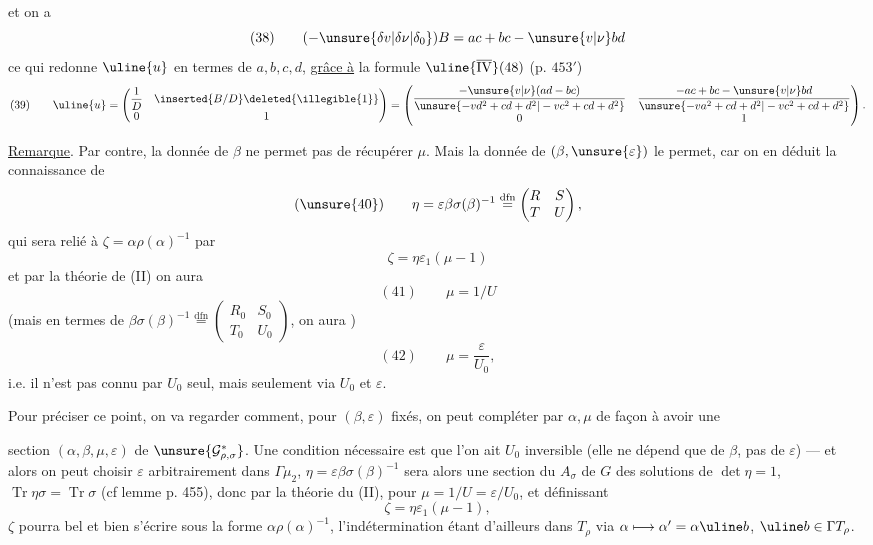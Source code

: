 et on a
\[
(38)\qquad (-\unsure{\delta v|\delta\nu|\delta_0})B=ac+bc-\unsure{v|\nu}bd
\]
ce qui redonne $\uline{u}$ en termes de $a,b,c,d$, \uline{grâce à} la formule $\uline{\overline{\mathrm{IV}}}(48)$ (p. $453'$)
\[
(39)\qquad \uline{u}=\begin{pmatrix}\dfrac1D&\inserted{B/D}\deleted{\illegible{1}}\\0&1\end{pmatrix}
=\begin{pmatrix}
\dfrac{-\unsure{v|\nu}(ad-bc)}{\unsure{-vd^2+cd+d^2|-vc^2+cd+d^2}}&\dfrac{-ac+bc-\unsure{v|\nu}bd}{\unsure{-va^2+cd+d^2|-vc^2+cd+d^2}}\\0&1
\end{pmatrix}.
\]

\uline{Remarque}. Par contre, la donnée de $\beta$   ne permet pas de récupérer $\mu$. Mais la donnée de $(\beta,\unsure{\varepsilon})$ le permet, car on en déduit la connaissance de
\[
(\unsure{40})\qquad \eta=\varepsilon\beta\sigma(\beta)^{-1}\overset{\mathrm{dfn}}=\begin{pmatrix}R&S\\T&U\end{pmatrix},
\]
qui sera relié à $\zeta=\alpha\rho(\alpha)^{-1}$ par
\[
\zeta=\eta\varepsilon_1(\mu-1)
\]
et par la théorie de (II) on aura
\[
(41)\qquad \mu=1/U
\]
(mais en termes de $\beta\sigma(\beta)^{-1}\overset{\mathrm{dfn}}=\begin{pmatrix}R_0&S_0\\T_0&U_0\end{pmatrix}$,
on aura )
\[
(42)\qquad \mu=\frac{\varepsilon}{U_0},
\]
i.e. il n'est  pas connu par $U_0$ seul, mais seulement via $U_0$ et $\varepsilon$. 

Pour préciser ce point, on va regarder  comment, pour $(\beta,\varepsilon)$ fixés, on peut compléter par $\alpha,\mu$ de façon à avoir une

section $(\alpha,\beta,\mu,\varepsilon)$ de $\unsure{\mathcal G^{*}_{\rho,\sigma}}$. Une condition nécessaire est que l'on ait $U_0$ inversible (elle ne dépend que de $\beta$, pas de $\varepsilon$) --- et alors on peut choisir $\varepsilon$ arbitrairement dans $\Gamma\mu_2$,  $\eta=\varepsilon\beta\sigma(\beta)^{-1}$ sera alors une section du  $A_\sigma$  de $G$ des solutions de $\det\eta=1$, $\operatorname{Tr}\eta\sigma=\operatorname{Tr}\sigma$ (cf lemme p. 455), donc par la théorie du (II), pour  $\mu=1/U=\varepsilon/U_0$,  et définissant
\[
\zeta=\eta\varepsilon_1(\mu-1),
\]
$\zeta$ pourra bel et bien s'écrire  sous la forme $\alpha\rho(\alpha)^{-1}$, l'indétermination étant d'ailleurs dans $T_\rho$ via $\alpha\longmapsto\alpha'=\alpha\uline b$, $\uline b\in\Gamma T_\rho$.

